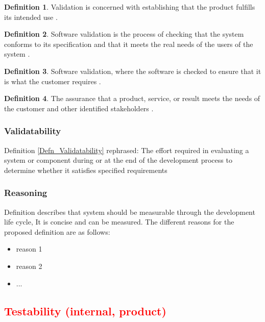 \documentclass[letterpaper, cleveref]{lipics-v2019}
\newcommand{\authornote}[3]{\textcolor{#1}{[#3 ---#2]}}
\newcommand{\authornote}[3]{}
\newcommand{\oo}[1]{\authornote{magenta}{OO}{#1}} %
\newcommand{\notdone}[1]{\textcolor{red}{#1}}
\theoremstyle{definition}
\newtheorem{defn}{Definition}
\begin{document}
\begin{defn}
	Validation is concerned with establishing that the product fulfills its
	intended use \citep{van2008software}.
\end{defn}

\begin{defn}
  Software validation is the process of checking that the system conforms to
  its specification and that it meets the real needs of the users of the
  system \citep{sommerville}. %
\end{defn}

\begin{defn}
	Software validation, where the software is checked to ensure that it is
  what the customer requires \citep{sommerville}. %
\end{defn}

\begin{defn}
  The assurance that a product, service, or result meets the needs of the
  customer and other identified stakeholders \citep{project2017guide}.
\end{defn}

\begin{mybox}
\subsubsection*{Validatability}
Definition \ref{Defn_Validatability} rephrased:  The effort required in
evaluating a system or component during or at the end of the development
process to determine whether it satisfies specified requirements
\end{mybox}

\subsubsection*{Reasoning}

Definition describes that system should be measurable through the
development life cycle, It is concise and can be measured.  The
different reasons for the proposed definition are as follows:

\begin{itemize}
  \item reason 1
  \item reason 2
  \item ...
\end{itemize}


\subsection{\notdone{Testability (internal, product)}} %
\end{document}
